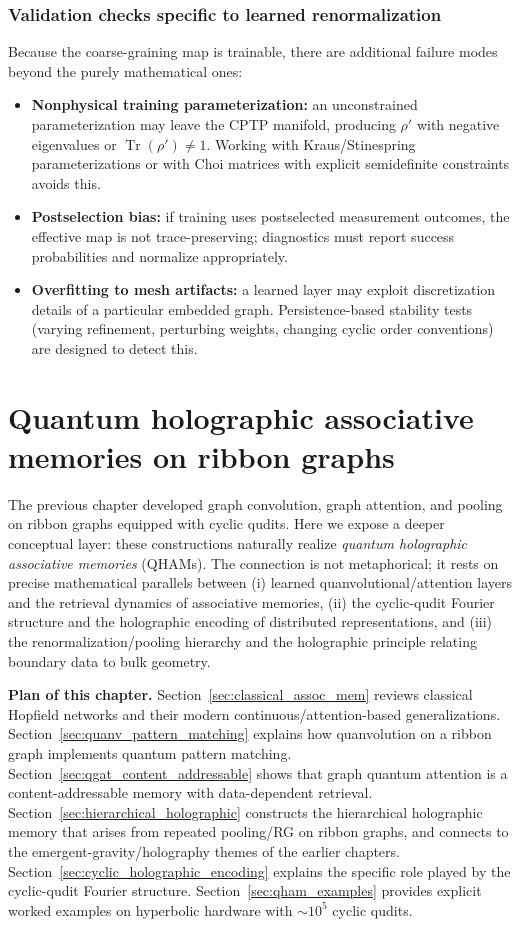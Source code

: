 \documentclass[11pt,oneside]{amsbook}
\numberwithin{equation}{section}
\theoremstyle{plain}
\theoremstyle{definition}
\theoremstyle{remark}
\DeclareMathOperator{\Tr}{\mathrm{Tr}}
\begin{document}
\subsection{Validation checks specific to learned renormalization}
Because the coarse-graining map is trainable, there are additional failure modes beyond the purely mathematical ones:
\begin{itemize}
\item \textbf{Nonphysical training parameterization:} an unconstrained parameterization may leave the CPTP manifold, producing $\rho'$ with negative eigenvalues or $\Tr(\rho')\neq 1$.
Working with Kraus/Stinespring parameterizations or with Choi matrices with explicit semidefinite constraints avoids this.
\item \textbf{Postselection bias:} if training uses postselected measurement outcomes, the effective map is not trace-preserving; diagnostics must report success probabilities and normalize appropriately.
\item \textbf{Overfitting to mesh artifacts:} a learned layer may exploit discretization details of a particular embedded graph.
Persistence-based stability tests (varying refinement, perturbing weights, changing cyclic order conventions) are designed to detect this.
\end{itemize}

\chapter{Quantum holographic associative memories on ribbon graphs}
\label{ch:qham}

The previous chapter developed graph convolution, graph attention, and pooling on ribbon graphs
equipped with cyclic qudits.  Here we expose a deeper conceptual layer: these constructions
naturally realize \emph{quantum holographic associative memories} (QHAMs).
The connection is not metaphorical; it rests on precise mathematical parallels between
(i) learned quanvolutional/attention layers and the retrieval dynamics of associative memories,
(ii) the cyclic-qudit Fourier structure and the holographic encoding of distributed
representations, and (iii) the renormalization/pooling hierarchy and the holographic principle
relating boundary data to bulk geometry.

\medskip
\noindent\textbf{Plan of this chapter.}
Section~\ref{sec:classical_assoc_mem} reviews classical Hopfield networks and their modern
continuous/attention-based generalizations.
Section~\ref{sec:quanv_pattern_matching} explains how quanvolution on a ribbon graph implements
quantum pattern matching.
Section~\ref{sec:qgat_content_addressable} shows that graph quantum attention is a
content-addressable memory with data-dependent retrieval.
Section~\ref{sec:hierarchical_holographic} constructs the hierarchical holographic memory
that arises from repeated pooling/RG on ribbon graphs, and connects to the
emergent-gravity/holography themes of the earlier chapters.
Section~\ref{sec:cyclic_holographic_encoding} explains the specific role played by the
cyclic-qudit Fourier structure.
Section~\ref{sec:qham_examples} provides explicit worked examples on hyperbolic hardware
with $\sim 10^5$ cyclic qudits.
\end{document}
